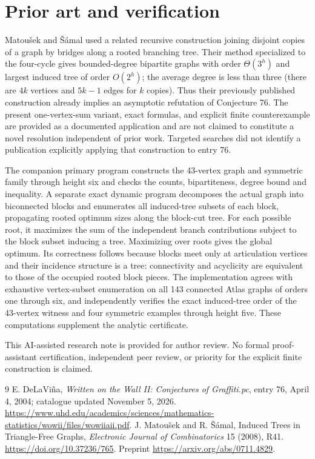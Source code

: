 \documentclass[11pt,a4paper]{article}
\begin{document}
\section{Prior art and verification}
Matou\v{s}ek and \v{S}\'amal \cite[Lemma 2.2]{ms} used a related recursive construction joining disjoint copies of a graph by bridges along a rooted branching tree. Their method specialized to the four-cycle gives bounded-degree bipartite graphs with order $\Theta(3^h)$ and largest induced tree of order $O(2^h)$; the average degree is less than three (there are $4k$ vertices and $5k-1$ edges for $k$ copies). Thus their previously published construction already implies an asymptotic refutation of Conjecture 76. The present one-vertex-sum variant, exact formulas, and explicit finite counterexample are provided as a documented application and are not claimed to constitute a novel resolution independent of prior work. Targeted searches did not identify a publication explicitly applying that construction to entry 76.

The companion primary program constructs the 43-vertex graph and symmetric family through height six and checks the counts, bipartiteness, degree bound and inequality. A separate exact dynamic program decomposes the actual graph into biconnected blocks and enumerates all induced-tree subsets of each block, propagating rooted optimum sizes along the block-cut tree. For each possible root, it maximizes the sum of the independent branch contributions subject to the block subset inducing a tree. Maximizing over roots gives the global optimum. Its correctness follows because blocks meet only at articulation vertices and their incidence structure is a tree: connectivity and acyclicity are equivalent to those of the occupied rooted block pieces. The implementation agrees with exhaustive vertex-subset enumeration on all 143 connected Atlas graphs of orders one through six, and independently verifies the exact induced-tree order of the 43-vertex witness and four symmetric examples through height five. These computations supplement the analytic certificate.

This AI-assisted research note is provided for author review. No formal proof-assistant certification, independent peer review, or priority for the explicit finite construction is claimed.
\begin{thebibliography}{9}
 E. DeLaVi\~na, \emph{Written on the Wall II: Conjectures of Graffiti.pc}, entry 76, April 4, 2004; catalogue updated November 5, 2026. \url{https://www.uhd.edu/academics/sciences/mathematics-statistics/wowii/files/wowiiaii.pdf}.
 J. Matou\v{s}ek and R. \v{S}\'amal, Induced Trees in Triangle-Free Graphs, \emph{Electronic Journal of Combinatorics} 15 (2008), R41. \url{https://doi.org/10.37236/765}. Preprint \url{https://arxiv.org/abs/0711.4829}.
\end{thebibliography}
\end{document}
